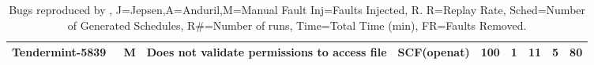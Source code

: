 \begin{table*}[t!]
\begin{tabular}{l|c|l|l|c|c|c|c|l}
		Tendermint-5839~\cite{tendermint5839}                                                                                       & M            & Does not validate permissions to access file                            & SCF(openat)                                                             & 100             & 1              & 11           & 5                 & 80            \\ \hline
	\end{tabular}
	\caption{Bugs reproduced by \sys, J=Jepsen,A=Anduril,M=Manual Fault Inj=Faults Injected, R. R=Replay Rate, Sched=Number of Generated Schedules, R\#=Number of runs, Time=Total Time (min), FR=Faults Removed.}
	\label{tab:bugs}
\end{table*}
